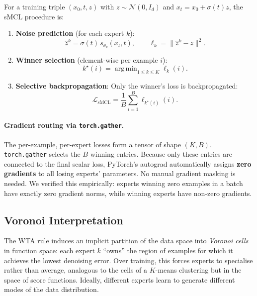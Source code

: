 \documentclass[11pt,a4paper]{article}
\newcommand{\N}{\mathcal{N}}
\newcommand{\Id}{I_d}
\DeclareMathOperator*{\argmin}{arg\,min}
\begin{document}
For a training triple $(x_0, t, z)$ with $z \sim \N(0, \Id)$ and
$x_t = x_0 + \sigma(t) z$, the sMCL procedure is:

\begin{enumerate}[nosep]
  \item \textbf{Noise prediction} (for each expert $k$):
    \begin{equation}
      \hat{z}^k = \sigma(t)\, s_{\theta_k}(x_t, t), \qquad
      \ell_k = \|\hat{z}^k - z\|^2.
      \label{eq:mcl_loss}
    \end{equation}
  \item \textbf{Winner selection} (element-wise per example $i$):
    \begin{equation}
      k^\star(i) = \argmin_{1 \le k \le K} \ell_k(i).
      \label{eq:winner}
    \end{equation}
  \item \textbf{Selective backpropagation}: Only the winner's loss is
    backpropagated:
    \begin{equation}
      \mathcal{L}_{\text{sMCL}} = \frac{1}{B}\sum_{i=1}^{B}
      \ell_{k^\star(i)}(i).
      \label{eq:smcl}
    \end{equation}
\end{enumerate}

\paragraph{Gradient routing via \texttt{torch.gather}.} The per-example,
per-expert losses form a tensor of shape $(K, B)$.
\texttt{torch.gather} selects the $B$ winning entries. Because only these
entries are connected to the final scalar loss, PyTorch's autograd
automatically assigns \textbf{zero gradients} to all losing experts'
parameters. No manual gradient masking is needed. We verified this
empirically: experts winning zero examples in a batch have exactly zero
gradient norms, while winning experts have non-zero gradients.

\subsection{Voronoi Interpretation}

The WTA rule induces an implicit partition of the data space into
\emph{Voronoi cells} in function space: each expert $k$ ``owns'' the
region of examples for which it achieves the lowest denoising error.
Over training, this forces experts to specialise rather than average,
analogous to the cells of a $K$-means clustering but in the space of
score functions. Ideally, different experts learn to generate different
modes of the data distribution.
\end{document}
